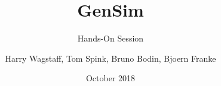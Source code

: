 \documentclass{beamer}
\title %
{GenSim}
\subtitle{Hands-On Session}
\author %
{Harry Wagstaff, Tom Spink, Bruno Bodin, Bjoern Franke}
\institute %
{
	Institute for Computing Systems Architecture \\
	University of Edinburgh
}
\date %
{October 2018}
\begin{document}
	
\begin{frame}
  \titlepage
\end{frame}

	
	












\end{document}

